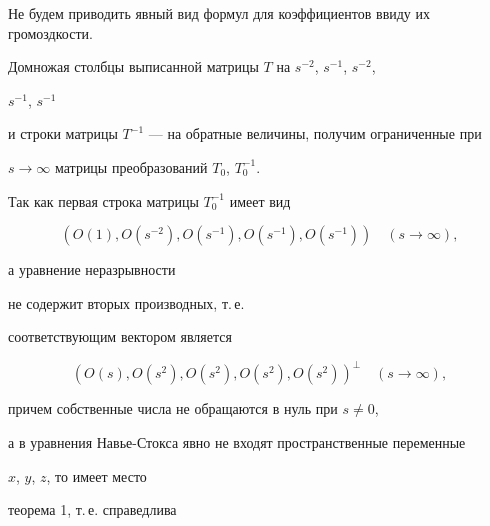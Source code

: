 Не будем приводить явный вид формул для коэффициентов ввиду их громоздкости.


Домножая столбцы выписанной матрицы $T$ на $s^{-2}$, $s^{-1}$, $s^{-2}$,


$s^{-1}$, $s^{-1}$


и строки матрицы $T^{-1}$ --- на обратные величины, получим ограниченные при


$s\rightarrow\infty$ матрицы преобразований $T_0$, $T_0^{-1}$.





Так как первая строка матрицы $T_0^{-1}$ имеет вид


\begin{equation}


\label{T0}


(O(1),O(s^{-2}), O(s^{-1}),O(s^{-1}),O(s^{-1}))\quad (s\rightarrow\infty),


\end{equation}


а уравнение неразрывности


не содержит вторых производных, т.\,е.


соответствующим вектором \cite{Titov1} является


$$


(O(s),O(s^{2}), O(s^{2}),O(s^{2}),O(s^{2}))^\perp\quad (s\rightarrow\infty),


$$


причем собственные числа не обращаются в нуль при $s\neq 0$,


а в уравнения Навье-Стокса явно не входят пространственные переменные


$x$, $y$, $z$, то имеет место


\cite{Titov1} теорема 1, т.\,е. справедлива





